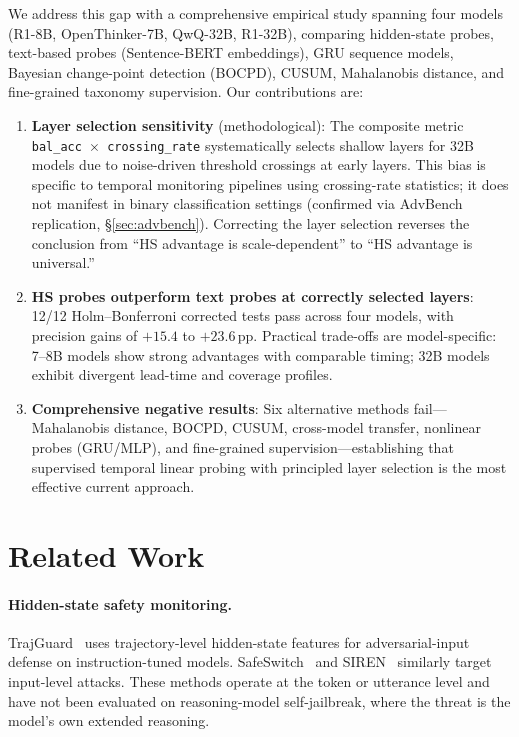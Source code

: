 \documentclass[11pt]{article}
\newcommand{\pp}{\,\text{pp}}
\begin{document}
We address this gap with a comprehensive empirical study spanning four models (R1-8B, OpenThinker-7B, QwQ-32B, R1-32B), comparing hidden-state probes, text-based probes (Sentence-BERT embeddings), GRU sequence models, Bayesian change-point detection (BOCPD), CUSUM, Mahalanobis distance, and fine-grained taxonomy supervision.
Our contributions are:

\begin{enumerate}[nosep,leftmargin=*]
\item \textbf{Layer selection sensitivity} (methodological): The composite metric \texttt{bal\_acc $\times$ crossing\_rate} systematically selects shallow layers for 32B models due to noise-driven threshold crossings at early layers.
This bias is specific to temporal monitoring pipelines using crossing-rate statistics; it does not manifest in binary classification settings (confirmed via AdvBench replication, \S\ref{sec:advbench}).
Correcting the layer selection reverses the conclusion from ``HS advantage is scale-dependent'' to ``HS advantage is universal.''

\item \textbf{HS probes outperform text probes at correctly selected layers}: 12/12 Holm--Bonferroni corrected tests pass across four models, with precision gains of $+15.4$ to $+23.6\pp$.
Practical trade-offs are model-specific: 7--8B models show strong advantages with comparable timing; 32B models exhibit divergent lead-time and coverage profiles.

\item \textbf{Comprehensive negative results}: Six alternative methods fail---Mahalanobis distance, BOCPD, CUSUM, cross-model transfer, nonlinear probes (GRU/MLP), and fine-grained supervision---establishing that supervised temporal linear probing with principled layer selection is the most effective current approach.
\end{enumerate}

\section{Related Work}
\label{sec:related}

\paragraph{Hidden-state safety monitoring.}
TrajGuard~\citep{li2024trajguard} uses trajectory-level hidden-state features for adversarial-input defense on instruction-tuned models.
SafeSwitch~\citep{chen2024safeswitch} and SIREN~\citep{wang2024siren} similarly target input-level attacks.
These methods operate at the token or utterance level and have not been evaluated on reasoning-model self-jailbreak, where the threat is the model's own extended reasoning.
\end{document}
